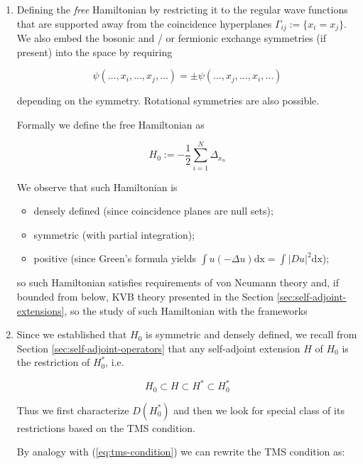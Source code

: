 \documentclass[11pt, a4paper, german]{article}
\theoremstyle{plain}
\theoremstyle{definition}
\theoremstyle{remark}
\numberwithin{equation}{section}
\numberwithin{theorem}{section}
\begin{document}
\begin{enumerate}
\item

Defining the \textit{free} Hamiltonian by restricting it to the regular wave functions that are supported away from the coincidence hyperplanes $\Gamma_{ij}:=\{x_i=x_j\}$. We also embed the bosonic and / or fermionic exchange symmetries (if present) into the space by requiring

\begin{equation}
\psi(\dots, x_i, \dots, x_j, \dots)=\pm \psi(\dots, x_j, \dots, x_i, \dots)
\end{equation}

depending on the symmetry. Rotational symmetries are also possible.

Formally we define the free Hamiltonian as

\begin{equation}
H_0 := - \frac 12 \sum _{i=1} ^N \Delta _{x_n}
\end{equation}

We observe that such Hamiltonian is
\begin{itemize}
\item densely defined (since coincidence planes are null sets);
\item symmetric (with partial integration);
\item positive (since Green's formula yields $\int u(-\Delta u) \text{dx} = \int \vert Du \vert ^2 \text{dx} $);
\end{itemize}

so such Hamiltonian satisfies requirements of von Neumann theory and, if bounded from below, KVB theory presented in the Section \ref{sec:self-adjoint-extensions}, so the study of such Hamiltonian with the frameworks%

\item 

Since we established that $H_0$ is symmetric and densely defined, we recall from Section \ref{sec:self-adjoint-operators} that any self-adjoint extension $H$ of $H_0$ is the restriction of $H_0^*$, i.e.

\begin{equation}
H_0\subset H \subset H^* \subset H_0^*
\end{equation}

Thus we first characterize $D(H_0^*)$ and then we look for special class of its restrictions based on the TMS condition.

By analogy with (\ref{eq:tms-condition}) we can rewrite the TMS condition as:


\end{enumerate}
\end{document}
